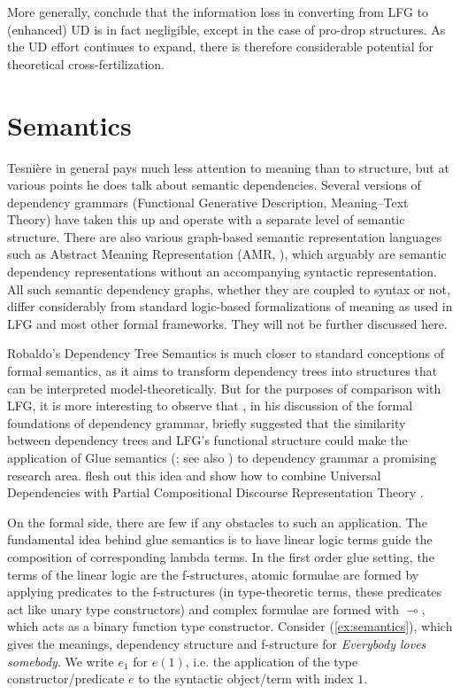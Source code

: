 \documentclass[output=paper,hidelinks]{langscibook}
\begin{document}
More generally, \citet{prz:pat:19:lre} conclude that the information
loss in converting from LFG to (enhanced) UD is in fact negligible,
except in the case of pro-drop structures. As the UD effort continues
to expand, there is therefore considerable potential for theoretical
cross-fertilization.


\section{Semantics}\label{sec:Dependency:semantics}
Tesnière in general pays much less attention to meaning than to
structure, but at various points he does talk about semantic
dependencies. Several versions of dependency grammars (Functional
Generative Description, Meaning--Text Theory) have taken this up and
operate with a separate level of semantic structure. There are also
various graph-based semantic representation languages such as Abstract
Meaning Representation (AMR, \citealt{banarescu-etal-2013}), which arguably are semantic
dependency representations without an accompanying syntactic
representation. All such semantic dependency graphs, whether they are coupled
to syntax or not, differ considerably from standard logic-based
formalizations of meaning as used in LFG and most other formal
frameworks. They will not be further discussed here.

Robaldo's Dependency Tree Semantics \citep{Robaldo2006} is much closer to standard conceptions of formal semantics, as it aims to transform dependency trees into structures that can be interpreted model-theoretically. But for the purposes of comparison with LFG, it is more interesting to observe that \citet[308]{Broeker2003}, in his discussion of the formal
foundations of dependency grammar, briefly suggested that the
similarity between dependency trees and LFG's functional structure
could make the application of Glue semantics
(\citealt{dalrympleetal93,Dalrymple:Glue}; see also
) to dependency grammar a promising research
area. \citet{gotham-haug:2018} flesh out this idea and show how to
combine Universal Dependencies with Partial Compositional Discourse Representation Theory \citep{Haug2014}.

On the formal side, there are few if any obstacles to such an
application.  The fundamental idea behind glue semantics is to have
linear logic terms guide the composition of corresponding lambda
terms.  In the first order glue setting, the terms of the linear logic
are the f-structures, atomic formulae are formed by applying
predicates to the f-structures (in type-theoretic terms, these
predicates act like unary type constructors) and complex formulae are
formed with $\multimap$, which acts as a binary function type
constructor. Consider (\ref{ex:semantics}), which gives the meanings, dependency structure and f-structure for \textit{Everybody loves somebody}. We write $e_1$ for $e(1)$, i.e. the application of the type constructor/predicate $e$ to the syntactic object/term with index $1$.
\end{document}
